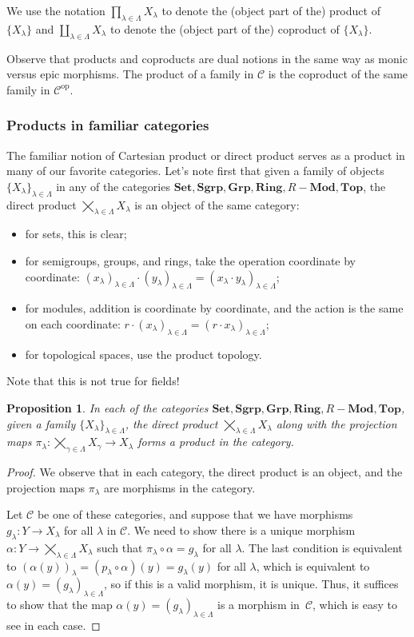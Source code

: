 \documentclass{amsart}[12pt]
\def\sC{\mathscr C}
\newcommand{\op}{\mathrm{op}}
\newcommand{\Def}[1]{#1 \index{#1}}
\numberwithin{equation}{section}
\theoremstyle{plain} %
\newtheorem{prop}[equation]{Proposition}
\theoremstyle{definition}
\theoremstyle{remark}
\newcommand{\sssec}[1]{\subsubsection{#1}}
\newcommand{\Set}{\mathbf{Set}}
\newcommand{\Grp}{\mathbf{Grp}}
\newcommand{\Sgrp}{\mathbf{Sgrp}}
\newcommand{\Ring}{\mathbf{Ring}}
\newcommand{\Mod}[1]{#1-\mathbf{Mod}}
\newcommand{\Top}{\mathbf{Top}}
\begin{document}
We use the notation \Def{$\prod_{\lambda \in \Lambda} X_\lambda$} to denote the (object part of the) product of $\{X_{\lambda}\}$ and \Def{$\coprod_{\lambda \in \Lambda} X_\lambda$} to denote the (object part of the) coproduct of $\{X_{\lambda}\}$.


Observe that products and coproducts are dual notions in the same way as monic versus epic morphisms. The product of a family in $\sC$ is the coproduct of the same family in $\sC^{\op}$.

\sssec{Products in familiar categories}

The familiar notion of Cartesian product or direct product serves as a product in many of our favorite categories. Let's note first that given a family of objects $\{X_\lambda\}_{\lambda\in \Lambda}$ in any of the categories $\Set,\Sgrp,\Grp,\Ring,\Mod{R},\Top$, the direct product $\bigtimes_{\lambda\in\Lambda} X_\lambda$ is an object of the same category:
\begin{itemize}
\item for sets, this is clear;
\item for semigroups, groups, and rings, take the operation coordinate by coordinate: $(x_{\lambda})_{\lambda\in \Lambda} \cdot (y_\lambda)_{\lambda\in \Lambda} = (x_\lambda \cdot y_\lambda)_{\lambda\in \Lambda}$;
\item for modules, addition is coordinate by coordinate, and the action is the same on each coordinate: $r\cdot (x_\lambda)_{\lambda\in \Lambda}=(r\cdot x_\lambda)_{\lambda\in \Lambda}$;
\item for topological spaces, use the product topology.
\end{itemize}
Note that this is not true for fields!

\begin{prop} In each of the categories $\Set,\Sgrp,\Grp,\Ring,\Mod{R}, \Top$, given a family $\{X_\lambda\}_{\lambda\in\Lambda}$, the direct product $\bigtimes_{\lambda\in\Lambda} X_\lambda$ along with the projection maps $\pi_{\lambda}:\bigtimes_{\gamma\in\Lambda} X_\gamma \to X_\lambda$ forms a product in the category.
\end{prop}
\begin{proof} We observe that in each category, the direct product is an object, and the projection maps $\pi_{\lambda}$ are morphisms in the category. 

Let $\sC$ be one of these categories, and suppose that we have morphisms $g_{\lambda}:Y \to X_\lambda$ for all $\lambda$ in $\sC$. We need to show there is a unique morphism $\alpha:Y \to \bigtimes_{\lambda\in\Lambda} X_\lambda$ such that $\pi_\lambda \circ \alpha = g_\lambda$ for all $\lambda$. The last condition
 is equivalent to $(\alpha(y))_\lambda=(p_\lambda\circ\alpha)(y) =g_\lambda(y)$ for all $\lambda$, which is equivalent to $\alpha(y)=(g_\lambda)_{\lambda\in \Lambda}$, so if this is a valid morphism, it is unique.  Thus, it suffices to show that the map $\alpha(y)=(g_\lambda)_{\lambda\in \Lambda}$ is a morphism in~$\sC$, which is easy to see in each case.
\end{proof}
\end{document}
